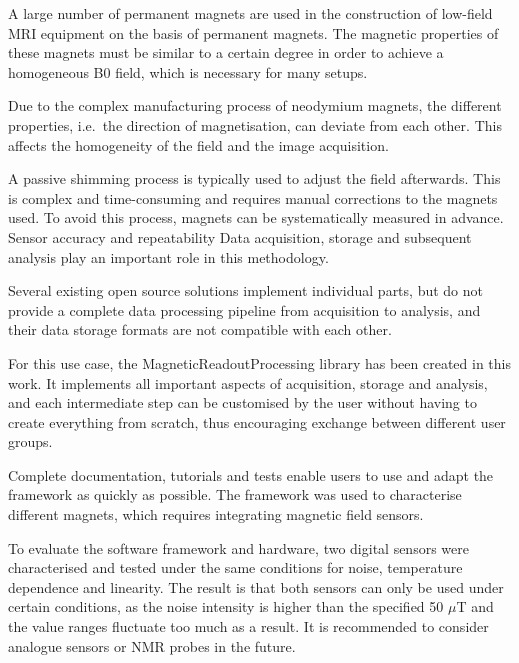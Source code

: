 A large number of permanent magnets are used in the construction of
low-field MRI equipment on the basis of permanent magnets. The magnetic
properties of these magnets must be similar to a certain degree in order
to achieve a homogeneous B0 field, which is necessary for many setups.

Due to the complex manufacturing process of neodymium magnets, the
different properties, i.e.~the direction of magnetisation, can deviate
from each other. This affects the homogeneity of the field and the image
acquisition.

A passive shimming process is typically used to adjust the field
afterwards. This is complex and time-consuming and requires manual
corrections to the magnets used. To avoid this process, magnets can be
systematically measured in advance. Sensor accuracy and repeatability
Data acquisition, storage and subsequent analysis play an important role
in this methodology.

Several existing open source solutions implement individual parts, but
do not provide a complete data processing pipeline from acquisition to
analysis, and their data storage formats are not compatible with each
other.

For this use case, the MagneticReadoutProcessing library has been
created in this work. It implements all important aspects of
acquisition, storage and analysis, and each intermediate step can be
customised by the user without having to create everything from scratch,
thus encouraging exchange between different user groups.

Complete documentation, tutorials and tests enable users to use and
adapt the framework as quickly as possible. The framework was used to
characterise different magnets, which requires integrating magnetic
field sensors.

To evaluate the software framework and hardware, two digital sensors
were characterised and tested under the same conditions for noise,
temperature dependence and linearity. The result is that both sensors
can only be used under certain conditions, as the noise intensity is
higher than the specified 50 \(\mu\)T and the value ranges fluctuate too
much as a result. It is recommended to consider analogue sensors or NMR
probes in the future.
